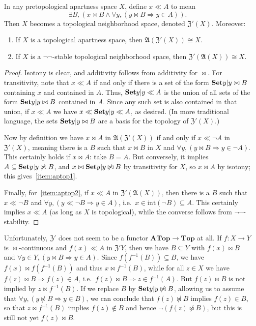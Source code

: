 \documentclass{article}
\def\int{\mathrm{int}}
\def\cpl#1{\neg #1}
\let\implies\Rightarrow
\def\inv{^{-1}}
\def\anti{\mathfrak{A}}
\def\neigh{\mathfrak{Z}}
\def\nn{\ensuremath{\neg\neg}}
\def\Top{\mathbf{Top}}
\def\ATop{\mathbf{ATop}}
\begin{document}
\begin{thm}\label{thm:aptop}
  In any pretopological apartness space $X$, define $x\ll A$ to mean
  \begin{equation}
    \label{eq:top-bowtie-ll-1}
    \exists B, (x\bowtie B \land \forall y, (y\bowtie B \implies y\in A)).
  \end{equation}
  Then $X$ becomes a topological neighborhood space, denoted $\neigh'(X)$.
  Moreover:
  \begin{enumerate}
  \item If $X$ is a topological apartness space, then $\anti(\neigh'(X)) \cong X$.\label{item:aptop1}
  \item If $X$ is a \nn-stable topological neighborhood space, then $\neigh'(\anti(X)) \cong X$.\label{item:aptop2}
  \end{enumerate}
\end{thm}
\begin{proof}
  Isotony is clear, and additivity follows from additivity for $\bowtie$.
  For transitivity, note that $x\ll A$ if and only if there is a set of the form $\setof{y|y\bowtie B}$ containing $x$ and contained in $A$.
  Thus, $\setof{y|y\ll A}$ is the union of all sets of the form $\setof{y|y\bowtie B}$ contained in $A$.
  Since any such set is also contained in that union, if $x\ll A$ we have $x\ll \setof{y|y\ll A}$, as desired.
  (In more traditional language, the sets $\setof{y|y\bowtie B}$ are a basis for the topology of $\neigh'(X)$.)

  Now by definition we have $x\bowtie A$ in $\anti(\neigh'(X))$ if and only if $x\ll \cpl{A}$ in $\neigh'(X)$, meaning there is a $B$ such that $x\bowtie B$ in $X$ and $\forall y, (y\bowtie B \implies y\in \cpl{A})$.
  This certainly holds if $x\bowtie A$: take $B=A$.
  But conversely, it implies $A\subseteq \setof{y|y\not\bowtie B}$, and $x\bowtie\setof{y|y\not\bowtie B}$ by transitivity for $X$, so $x\bowtie A$ by isotony; this gives~\ref{item:aptop1}.

  Finally, for~\ref{item:aptop2}, if $x \ll A$ in $\neigh'(\anti(X))$, then there is a $B$ such that $x\ll \cpl{B}$ and $\forall y, (y\ll \cpl{B} \implies y\in A)$, i.e.\ $x\in \int(\cpl{B}) \subseteq A$.
  This certainly implies $x\ll A$ (as long as $X$ is topological), while the converse follows from \nn-stability.
\end{proof}

Unfortunately, $\neigh'$ does not seem to be a functor $\ATop\to \Top$ at all.
If $f:X\to Y$ is $\bowtie$-continuous and $f(x)\ll A$ in $\neigh' Y$, then we have $B\subseteq Y$ with $f(x)\bowtie B$ and $\forall y\in Y, (y\bowtie B \implies y\in A)$.
Since $f(f\inv(B)) \subseteq B$, we have $f(x)\bowtie f(f\inv(B))$ and thus $x\bowtie f\inv(B)$, while for all $z\in X$ we have $f(z)\bowtie B \implies f(z)\in A$, i.e.\ $f(z)\bowtie B \implies z\in f\inv(A)$.
But $f(z)\bowtie B$ is not implied by $z\bowtie f\inv(B)$.
If we replace $B$ by $\setof{y|y\not\bowtie B}$, allowing us to assume that $\forall y, (y\not\bowtie B \implies y\in B)$, we can conclude that $f(z)\not\bowtie B$ implies $f(z)\in B$, so that $z\bowtie f\inv(B)$ implies $f(z) \notin B$ and hence $\neg(f(z)\not\bowtie B)$, but this is still not yet $f(z)\bowtie B$.
\end{document}
